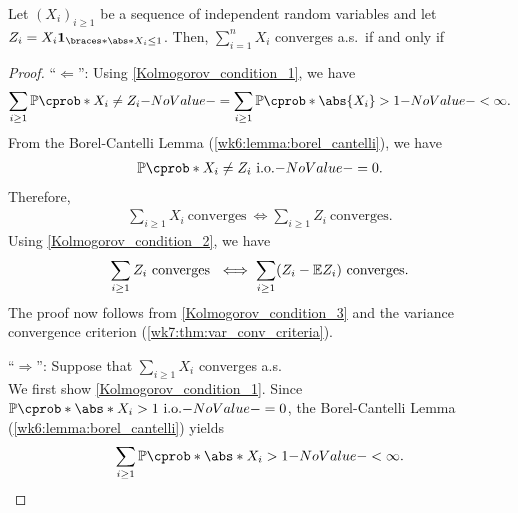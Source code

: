 \documentclass[12pt]{article}
\begin{document}
\begin{Theorem} \label{Kolmogorov_Three_Series_Thm}
Let $(X_i)_{i\geq1}$ be a sequence of independent random variables and let $Z_i = X_i \indicator{\abs*{X_i} \leq 1}$. Then, $\sum_{i=1}^n X_i$ converges a.s.\ if and only if
\end{Theorem}
%
\begin{proof}
``$\Leftarrow$'': Using \cref{Kolmogorov_condition_1}, we have
\begin{align*}
\sum_{i \geq 1} \P(X_i \neq Z_i) = \sum_{i \geq 1} \P(\abs{X_i} > 1) < \infty.
\end{align*}
From the Borel-Cantelli Lemma (\cref{wk6:lemma:borel_cantelli}), we have 
\begin{align*}
\P(X_i \neq Z_i\ \text{i.o.}) = 0.
\end{align*}
Therefore, 
\begin{align*}
\sum_{i \geq 1} X_i \ \text{converges}\
\iff
\sum_{i \geq 1} Z_i \ \text{converges}.
\end{align*}
Using \cref{Kolmogorov_condition_2}, we have
\begin{align*}
\sum_{i \geq 1} Z_i \ \text{converges}\ 
\iff
\sum_{i \geq 1} (Z_i - \E Z_i) \ \text{converges}.
\end{align*}
The proof now follows from \cref{Kolmogorov_condition_3} and the variance convergence criterion (\cref{wk7:thm:var_conv_criteria}).

``$\Rightarrow$'': Suppose that $\sum_{i \geq 1} X_i$ converges a.s.\\
We first show \cref{Kolmogorov_condition_1}. Since $\P(\abs*{X_i} > 1 \io) = 0$, the Borel-Cantelli Lemma (\cref{wk6:lemma:borel_cantelli}) yields 
\begin{align*}
\sum_{i \geq 1} \P(\abs*{X_i} > 1) < \infty. 
\end{align*}



\end{proof}
\end{document}
